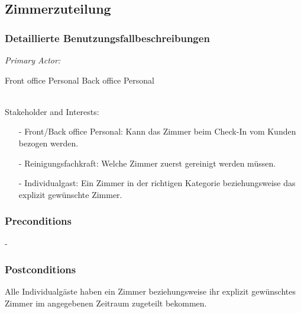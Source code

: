 \documentclass[./detailed_overview_usecases.tex]{subfiles}
\begin{document}
    \subsection{Zimmerzuteilung}
    \subsubsection{Detaillierte Benutzungsfallbeschreibungen}
    \textit{Primary Actor:}
    \begin{enumerate}
        Front office Personal
        Back office Personal
    \end{enumerate}
    \\
    Stakeholder and Interests:
    \begin{itemize}
        \item[-] Front/Back office Personal: Kann das Zimmer beim Check-In vom Kunden bezogen werden.
        \item[-] Reinigungsfachkraft: Welche Zimmer zuerst gereinigt werden müssen.
        \item[-] Individualgast: Ein Zimmer in der richtigen Kategorie beziehungsweise das explizit gewünschte Zimmer.
    \end{itemize}

    \subsubsection*{Preconditions}
    -
    \subsubsection*{Postconditions}
    Alle Individualgäste haben ein Zimmer beziehungsweise ihr explizit gewünschtes Zimmer im angegebenen Zeitraum zugeteilt bekommen.
\end{document}

